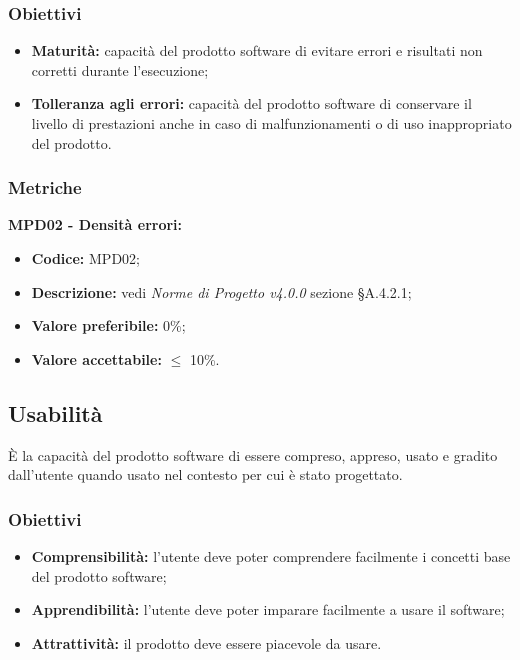 \subsubsection{Obiettivi}
\begin{itemize}
    \item \textbf{Maturità:} capacità del prodotto software di evitare errori e risultati non corretti durante l’esecuzione;
    \item \textbf{Tolleranza agli errori:} capacità del prodotto software di conservare il livello di prestazioni
          anche in caso di malfunzionamenti o di uso inappropriato del prodotto.
\end{itemize}
\subsubsection{Metriche}
\textbf{MPD02 - Densità errori:}
\begin{itemize}
    \item \textbf{Codice:} MPD02;
    \item \textbf{Descrizione:} vedi \textit{Norme di Progetto v4.0.0} sezione \S A.4.2.1;
    \item \textbf{Valore preferibile:} 0\%;
    \item \textbf{Valore accettabile:} $\leq$ 10\%.
\end{itemize}
\subsection{Usabilità}
È la capacità del prodotto software di essere compreso, appreso, usato e gradito dall’utente quando usato nel contesto per cui è stato progettato.
\subsubsection{Obiettivi}
\begin{itemize}
    \item \textbf{Comprensibilità:} l'utente deve poter comprendere facilmente i concetti base del prodotto software;
    \item \textbf{Apprendibilità:} l'utente deve poter imparare facilmente a usare il software;
    \item \textbf{Attrattività:} il prodotto deve essere piacevole da usare.
\end{itemize}
